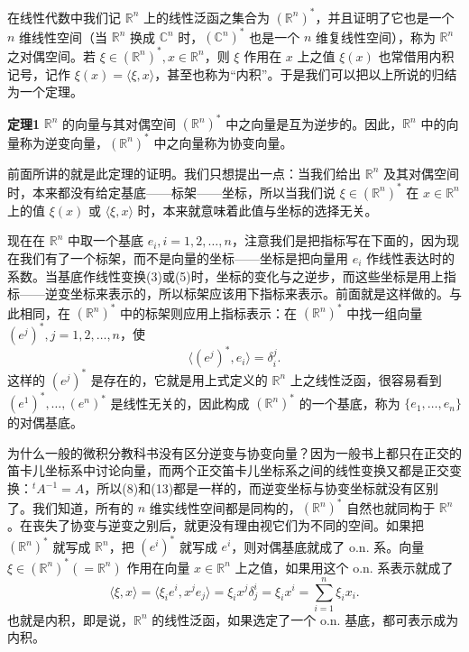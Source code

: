 在线性代数中我们记 $\mathbb R^n$ 上的线性泛函之集合为 $(\mathbb R^n)^*$，并且证明了它也是一个 $n$ 维线性空间（当 $\mathbb R^n$ 换成 $\mathbb C^n$ 时，$(\mathbb C^n)^*$ 也是一个 $n$ 维复线性空间），称为 $\mathbb R^n$ 之对偶空间。若 $\xi\in(\mathbb R^n)^*,x\in\mathbb R^n$，则 $\xi$ 作用在 $x$ 上之值 $\xi(x)$ 也常借用内积记号，记作 $\xi(x)=\langle\xi,x\rangle$，甚至也称为“内积”。于是我们可以把以上所说的归结为一个定理。

\noindent\textbf{定理1}\quad
$\mathbb R^n$ 的向量与其对偶空间 $(\mathbb R^n)^*$ 中之向量是互为逆步的。因此，$\mathbb R^n$ 中的向量称为逆变向量，$(\mathbb R^n)^*$ 中之向量称为协变向量。

前面所讲的就是此定理的证明。我们只想提出一点：当我们给出 $\mathbb R^n$ 及其对偶空间时，本来都没有给定基底——标架——坐标，所以当我们说 $\xi\in(\mathbb R^n)^*$ 在 $x\in\mathbb R^n$ 上的值 $\xi(x)$ 或 $\langle\xi,x\rangle$ 时，本来就意味着此值与坐标的选择无关。

现在在 $\mathbb R^n$ 中取一个基底 $e_i,i=1,2,\ldots,n$，注意我们是把指标写在下面的，因为现在我们有了一个标架，而不是向量的坐标——坐标是把向量用 $e_i$ 作线性表达时的系数。当基底作线性变换(3)或(5)时，坐标的变化与之逆步，而这些坐标是用上指标——逆变坐标来表示的，所以标架应该用下指标来表示。前面就是这样做的。与此相同，在 $(\mathbb R^n)^*$ 中的标架则应用上指标表示：在 $(\mathbb R^n)^*$ 中找一组向量 $(e^j)^*,j=1,2,\ldots,n$，使
\begin{equation}
 \langle(e^j)^*,e_i\rangle=\delta_i^j.
 \tag{14}
\end{equation}
这样的 $(e^j)^*$ 是存在的，它就是用上式定义的 $\mathbb R^n$ 上之线性泛函，很容易看到 $(e^1)^*,\ldots,(e^n)^*$ 是线性无关的，因此构成 $(\mathbb R^n)^*$ 的一个基底，称为 $\{e_1,\ldots,e_n\}$ 的对偶基底。

为什么一般的微积分教科书没有区分逆变与协变向量？因为一般书上都只在正交的笛卡儿坐标系中讨论向量，而两个正交笛卡儿坐标系之间的线性变换又都是正交变换：${}^{t}\!A^{-1}=A$，所以(8)和(13)都是一样的，而逆变坐标与协变坐标就没有区别了。我们知道，所有的 $n$ 维实线性空间都是同构的，$(\mathbb R^n)^*$ 自然也就同构于 $\mathbb R^n$。在丧失了协变与逆变之别后，就更没有理由视它们为不同的空间。如果把 $(\mathbb R^n)^*$ 就写成 $\mathbb R^n$，把 $(e^i)^*$ 就写成 $e^i$，则对偶基底就成了 o.n. 系。向量 $\xi\in(\mathbb R^n)^*(=\mathbb R^n)$ 作用在向量 $x\in\mathbb R^n$ 上之值，如果用这个 o.n. 系表示就成了
\[
 \langle\xi,x\rangle=\langle\xi_i e^i,x^j e_j\rangle
 =\xi_i x^j\delta_j^i=\xi_i x^i=\sum_{i=1}^n\xi_i x_i.
\]
也就是内积，即是说，$\mathbb R^n$ 的线性泛函，如果选定了一个 o.n. 基底，都可表示成为内积。

